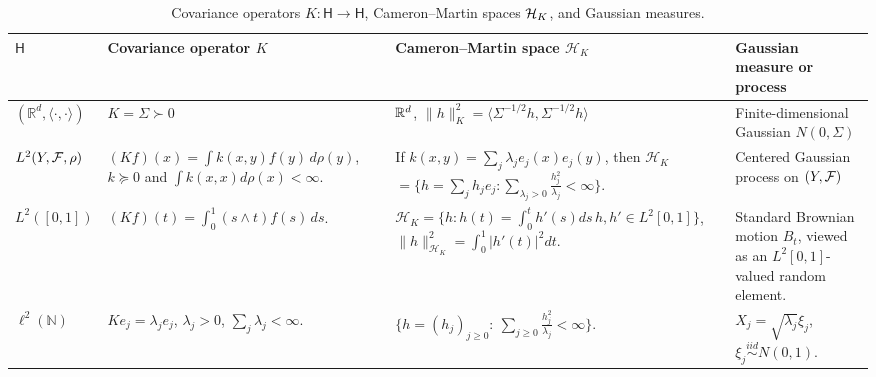 \begin{table}[t]
\centering
\tiny
\setlength{\tabcolsep}{2.5pt}
\renewcommand{\arraystretch}{1.12}
\begin{tabularx}{\textwidth}{
@{}p{}
p{}
p{}
X@{}}
\toprule
\(\mathsf H\)
& Covariance operator \(K\)
& Cameron--Martin space \(\mathcal H_K\)
& Gaussian measure or process \\
\midrule

\((\mathbb R^d, \langle \cdot, \cdot \rangle)\)
&
\(K=\Sigma\succ0\)
&
\(\mathbb{R}^d\), 
\(\|h\|_{K}^2= \langle \Sigma^{-1/2} h, \Sigma^{-1/2} h \rangle \)
&
Finite-dimensional Gaussian \(N(0,\Sigma)\)
\\


\addlinespace[1.5pt]

\(L^2(Y,\mathcal{F},\rho)\)
&
\((Kf)(x)=\int k(x,y)f(y)\,d\rho(y)\),
\(k\succeq0\) and \(\int k(x,x)d\rho(x)<\infty\).
&
If \(k(x,y)=\sum_j\lambda_j e_j(x)e_j(y)\), then $\mathcal H_K$
\(=\{h=\sum_jh_je_j:\sum_{\lambda_j>0}\frac{h_j^2}{\lambda_j}<\infty\}\).
&
Centered Gaussian process on $(Y, \mathcal{F})$ 
\\

\addlinespace[1.5pt]

\(L^2([0,1])\)
&
\((Kf)(t)=\int_0^1(s\wedge t)f(s)\,ds\).
&
\(\mathcal H_K=\{h: h(t)= \int_{0}^{t}h'(s)ds\, h, h'\in L^2[0,1]\}\),
\(\|h\|_{\mathcal H_K}^2=\int_0^1|h'(t)|^2dt\).
&
Standard Brownian motion \(B_t\), viewed as an \(L^2[0,1]\)-valued  random element.
\\


\addlinespace[1.5pt]

\(\ell^2(\mathbb N)\)
&
\(K e_j=\lambda_j e_j\), \(\lambda_j >0\), \(\sum_j\lambda_j<\infty\).
&
\(\{h=(h_j)_{j\geq 0}:\ \sum_{j\geq 0} \frac{h_j^2}{\lambda_j}<\infty\}\).
&
\(X_j=\sqrt{\lambda_j}\xi_j\), \(\xi_j\stackrel{iid}{\sim}N(0,1)\).
\\



\bottomrule
\end{tabularx}
\caption{Covariance operators \(K: \mathsf H \to \mathsf H\),  Cameron--Martin spaces $\mathcal{H}_{K}$, and  Gaussian measures.}
\label{tab:gaussian-covariance-examples}
\end{table}

